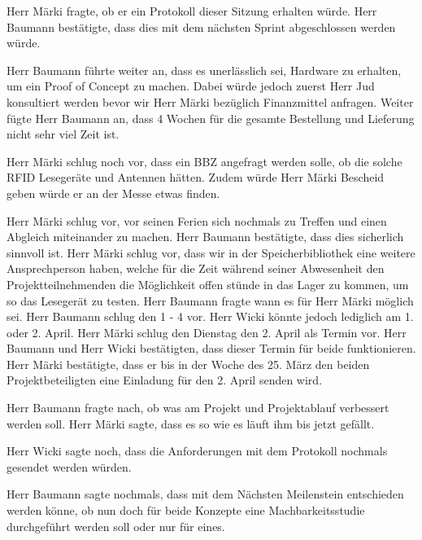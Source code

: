 \documentclass[parskip=full, a4paper]{scrreprt}
\begin{document}
Herr Märki fragte, ob er ein Protokoll dieser Sitzung erhalten würde. Herr Baumann bestätigte, dass dies mit dem nächsten Sprint abgeschlossen werden würde.

Herr Baumann führte weiter an, dass es unerlässlich sei, Hardware zu erhalten, um ein Proof of Concept zu machen. Dabei würde jedoch zuerst Herr Jud konsultiert werden bevor wir Herr Märki bezüglich Finanzmittel anfragen.
Weiter fügte Herr Baumann an, dass 4 Wochen für die gesamte Bestellung und Lieferung nicht sehr viel Zeit ist. 

Herr Märki schlug noch vor, dass ein BBZ angefragt werden solle, ob die solche RFID Lesegeräte und Antennen hätten. 
Zudem würde Herr Märki Bescheid geben würde er an der Messe etwas finden.

Herr Märki schlug vor, vor seinen Ferien sich nochmals zu Treffen und einen Abgleich miteinander zu machen.
Herr Baumann bestätigte, dass dies sicherlich sinnvoll ist.
Herr Märki schlug vor, dass wir in der Speicherbibliothek eine weitere Ansprechperson haben, welche für die Zeit während seiner Abwesenheit den Projektteilnehmenden die Möglichkeit offen stünde in das Lager zu kommen, um so das Lesegerät zu testen.
Herr Baumann fragte wann es für Herr Märki möglich sei.
Herr Baumann schlug den 1 - 4 vor. Herr Wicki könnte jedoch lediglich am 1. oder 2. April.
Herr Märki schlug den Dienstag den 2. April als Termin vor. 
Herr Baumann und Herr Wicki bestätigten, dass dieser Termin für beide funktionieren.
Herr Märki bestätigte, dass er bis in der Woche des 25. März den beiden Projektbeteiligten eine Einladung für den 2. April senden wird.

Herr Baumann fragte nach, ob was am Projekt und Projektablauf verbessert werden soll. Herr Märki sagte, dass es so wie es läuft ihm bis jetzt gefällt.

Herr Wicki sagte noch, dass die Anforderungen mit dem Protokoll nochmals gesendet werden würden.

Herr Baumann sagte nochmals, dass mit dem Nächsten Meilenstein entschieden werden könne, ob nun doch für beide Konzepte eine Machbarkeitsstudie durchgeführt werden soll oder nur für eines.
\end{document}
